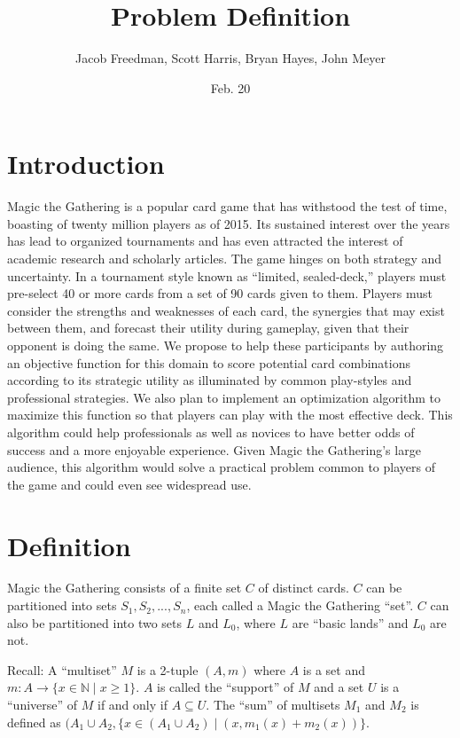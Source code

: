 \documentclass[12pt, letterpaper]{article}
\title{Problem Definition}
\date{Feb. 20}
\author{Jacob Freedman, Scott Harris, Bryan Hayes, John Meyer}
\begin{document}
\maketitle

\section{Introduction}

Magic the Gathering is a popular card game that has withstood the test of time,
boasting of twenty million players as of 2015.
Its sustained interest over the years has lead to organized tournaments
and has even attracted the interest of academic research and scholarly articles.
The game hinges on both strategy and uncertainty.
In a tournament style known as \enquote{limited, sealed-deck,}
players must pre-select 40 or more cards from a set of 90 cards given to them.
Players must consider the strengths and weaknesses of each card,
the synergies that may exist between them,
and forecast their utility during gameplay,
given that their opponent is doing the same.
We propose to help these participants by authoring an objective function for this
domain to score potential card combinations according to its strategic utility
as illuminated by common play-styles and professional strategies.
We also plan to implement an optimization algorithm to maximize this function
so that players can play with the most effective deck.
This algorithm could help professionals as well as novices to have better odds of success
and a more enjoyable experience.
Given Magic the Gathering’s large audience,
this algorithm would solve a practical problem common to players of the game
and could even see widespread use.

\section{Definition}

Magic the Gathering consists of a finite set $ C $ of distinct cards.
$ C $ can be partitioned into sets $ S_1, S_2, ..., S_n $, each called a Magic the Gathering \enquote{set}.
$ C $ can also be partitioned into two sets $ L $ and $ L_0 $, where $ L $ are \enquote{basic lands} and $ L_0 $ are not.

Recall: A \enquote{multiset} $ M $ is a 2-tuple $ (A, m) $
where $ A $ is a set and $ m: A \rightarrow \{x \in \mathbb{N} \mid x \ge 1 \} $.
$ A $ is called the \enquote{support} of $ M $ and
a set $ U $ is a \enquote{universe} of $ M $ if and only if $ A \subseteq U $.
The \enquote{sum} of multisets $ M_1 $ and $ M_2 $ is defined as
$ (A_1 \cup A_2, \{ x \in (A_1 \cup A_2) \mid (x, m_1(x) + m_2(x)) \} $.
\end{document}
